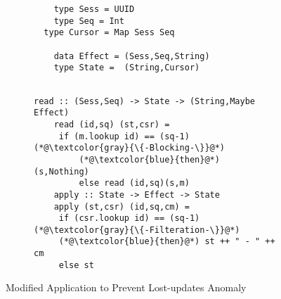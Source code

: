 \begin{figure}[t]
	\centering
	\begin{subfigure}[t]{0.4\textwidth}
	\begin{lstlisting}
	type Sess = UUID
	type Seq = Int
  type Cursor = Map Sess Seq       

	data Effect = (Sess,Seq,String)
 	type State =  (String,Cursor)
  
	\end{lstlisting}		  
	\end{subfigure}
	\hfill
        \begin{subfigure}[t]{0.575\textwidth}
	
	\begin{lstlisting}[firstnumber=7]
	read :: (Sess,Seq) -> State -> (String,Maybe Effect)
	read (id,sq) (st,csr) = 
     if (m.lookup id) == (sq-1)    (*@\textcolor{gray}{\{-Blocking-\}}@*)
		 (*@\textcolor{blue}{then}@*) (s,Nothing)
		 else read (id,sq)(s,m)
	apply :: State -> Effect -> State 
	apply (st,csr) (id,sq,cm) = 
     if (csr.lookup id) == (sq-1)  (*@\textcolor{gray}{\{-Filteration-\}}@*)
     (*@\textcolor{blue}{then}@*) st ++ " - " ++ cm
     else st

	\end{lstlisting}		  
        \end{subfigure}

	\hrulefill
	\caption{Modified Application to Prevent Lost-updates Anomaly}
	\label{fig:modified_code}
\end{figure}



